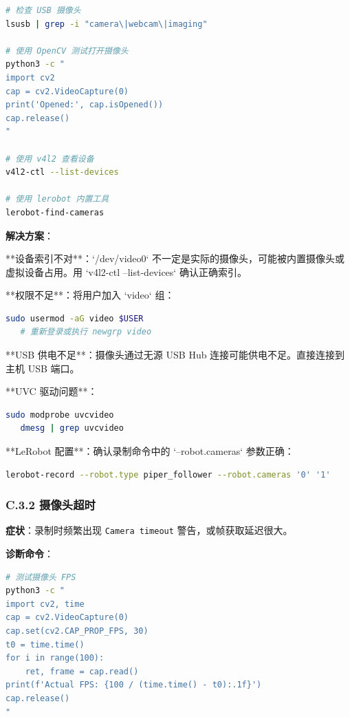\documentclass[UTF8,a4paper,11pt]{ctexart}
\begin{document}
{\begin{lstlisting}[language=bash]
# 检查 USB 摄像头
lsusb | grep -i "camera\|webcam\|imaging"

# 使用 OpenCV 测试打开摄像头
python3 -c "
import cv2
cap = cv2.VideoCapture(0)
print('Opened:', cap.isOpened())
cap.release()
"

# 使用 v4l2 查看设备
v4l2-ctl --list-devices

# 使用 lerobot 内置工具
lerobot-find-cameras
\end{lstlisting}

\textbf{解决方案}：
\item[1] **设备索引不对**：`/dev/video0` 不一定是实际的摄像头，可能被内置摄像头或虚拟设备占用。用 `v4l2-ctl --list-devices` 确认正确索引。
\item[2] **权限不足**：将用户加入 `video` 组：
\begin{lstlisting}[language=bash]
   sudo usermod -aG video $USER
   # 重新登录或执行 newgrp video
\end{lstlisting}
\item[3] **USB 供电不足**：摄像头通过无源 USB Hub 连接可能供电不足。直接连接到主机 USB 端口。
\item[4] **UVC 驱动问题**：
\begin{lstlisting}[language=bash]
   sudo modprobe uvcvideo
   dmesg | grep uvcvideo
\end{lstlisting}
\item[5] **LeRobot 配置**：确认录制命令中的 `--robot.cameras` 参数正确：
\begin{lstlisting}[language=bash]
   lerobot-record --robot.type piper_follower --robot.cameras '0' '1'
\end{lstlisting}

\subsubsection{C.3.2 摄像头超时}

\textbf{症状}：录制时频繁出现 \texttt{Camera timeout} 警告，或帧获取延迟很大。

\textbf{诊断命令}：
\begin{lstlisting}[language=bash]
# 测试摄像头 FPS
python3 -c "
import cv2, time
cap = cv2.VideoCapture(0)
cap.set(cv2.CAP_PROP_FPS, 30)
t0 = time.time()
for i in range(100):
    ret, frame = cap.read()
print(f'Actual FPS: {100 / (time.time() - t0):.1f}')
cap.release()
"
\end{lstlisting}

}
\end{document}

